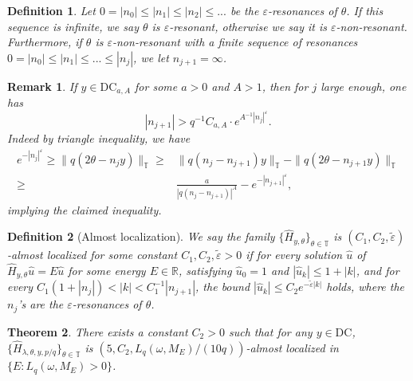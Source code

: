 \documentclass[11pt]{amsart}
\newtheorem{theorem}{Theorem}[section]
\newtheorem{remark}[theorem]{Remark}
\newtheorem{definition}{Definition}[section]
\newcommand{\R}{\mathbb R}
\newcommand{\T}{\mathbb T}
\begin{document}
\begin{definition}
Let $0=|n_0|\leq |n_1|\leq |n_2|\leq ...$ be the $\varepsilon$-resonances of $\theta$. If this sequence is infinite, we
say $\theta$ is $\varepsilon$-resonant, otherwise we say it is $\varepsilon$-non-resonant. Furthermore, if $\theta$ is $\varepsilon$-non-resonant with a finite sequence of resonances $0=|n_0|\leq |n_1|\leq ...\leq |n_j|$, we let $n_{j+1}=\infty$.
\end{definition}

\begin{remark}
If $y\in \mathrm{DC}_{a,A}$ for some $a>0$ and $A>1$, then for $j$ large enough, one has 
\[|n_{j+1}|>q^{-1} C_{a,A}\cdot e^{A^{-1}|n_j|^{\varepsilon}}.\] 
Indeed by triangle inequality, we have
\begin{align}
    e^{-|n_j|^{\varepsilon}}\geq \|q (2\theta-n_jy)\|_{\T}
    \geq &\|q(n_j-n_{j+1})y\|_{\T}-\|q (2\theta-n_{j+1}y)\|_{\T}\\
    \geq &\frac{a}{|q(n_j-n_{j+1})|^A}-e^{-|n_{j+1}|^{\varepsilon}},
\end{align}
implying the claimed inequality. 
\end{remark}

\begin{definition}[Almost localization]\label{def:almost_AL}
We say the family $\{\hat{H}_{y,\theta}\}_{\theta\in \T}$ is $(C_1, C_2,\tilde{\varepsilon})$-{\em almost localized} for some constant $C_1, C_2, \tilde{\varepsilon}>0$ if for every solution $\hat{u}$ of $\hat{H}_{y,\theta}\hat{u}=E\hat{u}$ for some energy $E\in \R$, satisfying $\hat{u}_0=1$ and $|\hat{u}_k|\leq 1+|k|$, and for every $C_1(1+|n_j|)<|k|<C_1^{-1}|n_{j+1}|$, the bound $|\hat{u}_k|\leq C_2 e^{-\tilde{\varepsilon} |k|}$ holds, where the $n_j$'s are the $\varepsilon$-resonances of $\theta$.
\end{definition}


\begin{theorem}\label{thm:sk_dual_almost_AL}
There exists a constant $C_2>0$ such that for any $y\in \mathrm{DC}$,
$\{\widehat{H}_{\lambda,\theta,y,p/q}\}_{\theta\in \T}$ is $(5, C_2, L_q(\omega,M_E)/(10q))$-almost localized in $\{E: L_q(\omega,M_E)>0\}$.
\end{theorem} 
\end{document}
